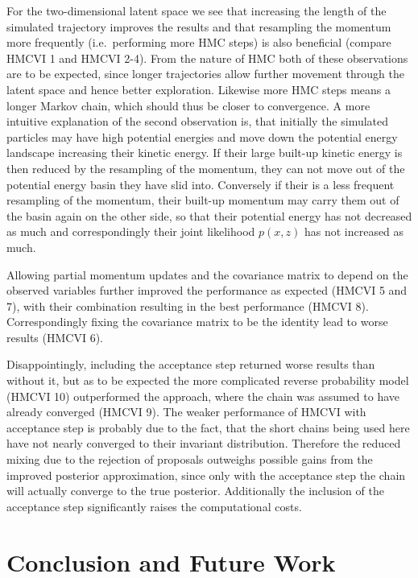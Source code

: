 \documentclass[12pt]{scrartcl}
\begin{document}
For the two-dimensional latent space we see that increasing the length of the simulated trajectory improves the results and that resampling the momentum more frequently (i.e.\ performing more HMC steps) is also beneficial (compare HMCVI 1 and HMCVI 2-4). From the nature of HMC both of these observations are to be expected, since longer trajectories allow further movement through the latent space and hence better exploration. Likewise more HMC steps means a longer Markov chain, which should thus be closer to convergence. A more intuitive explanation of the second observation is, that initially the simulated particles may have high potential energies and move down the potential energy landscape increasing their kinetic energy. If their large built-up kinetic energy is then reduced by the resampling of the momentum, they can not move out of the potential energy basin they have slid into. Conversely if their is a less frequent resampling of the momentum, their built-up momentum may carry them out of the basin again on the other side, so that their potential energy has not decreased as much and correspondingly their joint likelihood $p(x, z)$ has not increased as much. %

Allowing partial momentum updates and the covariance matrix to depend on the observed variables further improved the performance as expected (HMCVI 5 and 7), with their combination resulting in the best performance (HMCVI 8). Correspondingly fixing the covariance matrix to be the identity lead to worse results (HMCVI 6).

Disappointingly, including the acceptance step returned worse results than without it, but as to be expected the more complicated reverse probability model (HMCVI 10) outperformed the approach, where the chain was assumed to have already converged (HMCVI 9). The weaker performance of HMCVI with acceptance step is probably due to the fact, that the short chains being used here have not nearly converged to their invariant distribution. Therefore the reduced mixing due to the rejection of proposals outweighs possible gains from the improved posterior approximation, since only with the acceptance step the chain will actually converge to the true posterior. Additionally the inclusion of the acceptance step significantly raises the computational costs.

\section{Conclusion and Future Work}
\end{document}
